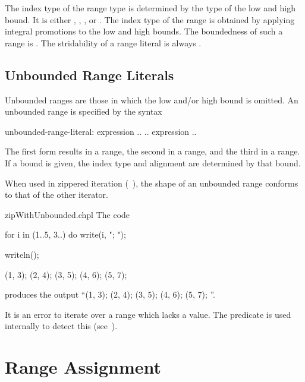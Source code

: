 The index type of the range type is determined by the type of the
low and high bound.  
It is either , ,
, or .  The index type of the range is obtained by
applying integral promotions to the low and high bounds.  The boundedness
of such a range is .  The stridability of a range literal
is always .

\subsection{Unbounded Range Literals}
\label{Unbounded_Ranges}

Unbounded ranges are those in which the low and/or high bound is
omitted.  
An unbounded range is specified by the syntax
\begin{syntax}
unbounded-range-literal:
  expression ..
  .. expression
  ..
\end{syntax}

The first form results in a  range, the
second in a  range, and the third in
a  range.  If a bound is given, the index type and alignment are determined
by that bound.

When used in zippered iteration (~), the shape of an
unbounded range conforms to that of the other iterator.

\begin{chapelexample}{zipWithUnbounded.chpl}
The code
\begin{chapel}
for i in (1..5, 3..) do
  write(i, "; ");
\end{chapel}
\begin{chapelpost}
writeln();
\end{chapelpost}
\begin{chapeloutput}
(1, 3); (2, 4); (3, 5); (4, 6); (5, 7); 
\end{chapeloutput}
produces the output ``(1, 3); (2, 4); (3, 5); (4, 6); (5, 7); ''.
\end{chapelexample}

It is an error to iterate over a range which lacks a  value.
The  predicate is used internally to detect this (see~).


\section{Range Assignment}
\label{Range_Assignment}

